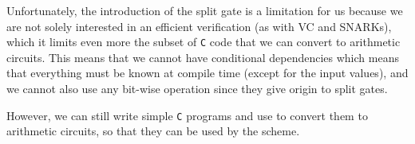 Unfortunately, the introduction of the split gate is a limitation for us
because we are not solely interested in an efficient verification (as with VC
and SNARKs), which it limits even more the subset of \texttt{C} code that we
can convert to arithmetic circuits. This means that we cannot have conditional
dependencies which means that everything must be known at compile time (except
for the input values), and we cannot also use any bit-wise operation since they
give origin to split gates.

However, we can still write simple \texttt{C} programs and use
 to convert them to arithmetic
circuits, so that they can be used by the 
scheme.

